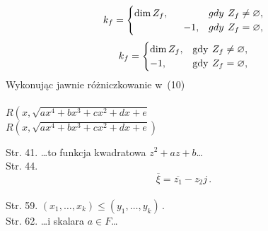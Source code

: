 \documentclass[a4paper,11pt]{article}
\begin{document}
\vspace{\spaceTwo}





\noindent
{} \\
\Jest
\begin{equation*}
  k_{ f }
  =
  \begin{cases}
    \dim Z_{ f }, & gdy\:\, Z_{ f } \neq \oldemptyset, \\
    \quad \quad \quad \quad \quad -1, & gdy\:\, Z_{ f } = \oldemptyset,
  \end{cases}
\end{equation*}
\Powin
\begin{equation*}
  k_{ f }
  =
  \begin{cases}
    \dim Z_{ f }, & \textrm{gdy}\:\, Z_{ f } \neq \oldemptyset, \\
    -1, & \textrm{gdy}\:\, Z_{ f } = \oldemptyset,
  \end{cases}
\end{equation*}
\Powin  Wykonując jawnie różniczkowanie w~(10) \\
 \\
\Jest
$R\left( x, \sqrt{ a x^{ 4 } + b x^{ 3 } + c x^{ 2 } + d x + e }
\right.$ \\
\Powin
$R\left( x, \sqrt{ a x^{ 4 } + b x^{ 3 } + c x^{ 2 } + d x + e }
\right)$ \\

\vspace{\spaceTwo}


Str. 41. \ldots to funkcja kwadratowa $z^2+az+b$\ldots \\
Str. 44.
  $$\overline{ \xi } = \overline{ z_{ 1 } } - z_{ 2 } j \, .$$ \\
Str. 59. $( x_{ 1 }, \ldots, x_{ k } ) \leq ( y_{ 1 }, \ldots, y_{ k } ) \, .$ \\
Str. 62. \ldots i skalara $a \in F$\ldots \\
\end{document}
